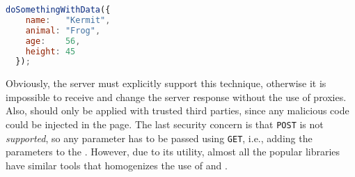 \begin{lstlisting}[language=JavaScript,label=jsonpdata,caption=Same JSON data wrapped in a custom function]
  doSomethingWithData({
    name:   "Kermit",
    animal: "Frog",
    age:    56,
    height: 45
  });
\end{lstlisting}

Obviously, the server must explicitly support this technique, otherwise it is impossible to receive and change the server response without the use of proxies.
Also,  should only be applied with trusted third parties, since any malicious code could be injected in the page.
The last security concern is that \texttt{POST} is not \emph{supported}, so any parameter has to be passed using \texttt{GET}, i.e., adding the parameters to the .
However, due to its utility, almost all the popular libraries have similar tools that homogenizes  the use of  and .


